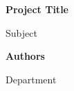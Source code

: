 \documentclass[a4paper]{article}
\begin{document}
\thispagestyle{empty}

\begin{titlepage}
    \begin{center}
        \vspace*{1cm}


        \vspace*{2cm}
            
        \Huge
        \textbf{Project Title}
            
        \vspace{0.5cm}
        \LARGE
        Subject
            
        \vspace{1.5cm}
            
        \textbf{Authors}

        \vspace{0.5cm}
        \textsf{Department}
           
        \vfill        

        \vspace{0.8cm}
            
    \end{center}
\end{titlepage}

\newpage

\tableofcontents

\newpage
\end{document}
